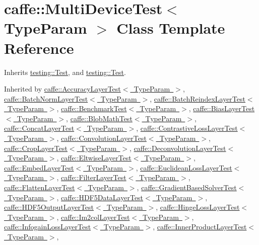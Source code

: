 \hypertarget{classcaffe_1_1_multi_device_test}{}\section{caffe\+:\+:Multi\+Device\+Test$<$ Type\+Param $>$ Class Template Reference}
\label{classcaffe_1_1_multi_device_test}


Inherits \mbox{\hyperlink{classtesting_1_1_test}{testing\+::\+Test}}, and \mbox{\hyperlink{classtesting_1_1_test}{testing\+::\+Test}}.



Inherited by \mbox{\hyperlink{classcaffe_1_1_accuracy_layer_test}{caffe\+::\+Accuracy\+Layer\+Test$<$ Type\+Param $>$}}, \mbox{\hyperlink{classcaffe_1_1_batch_norm_layer_test}{caffe\+::\+Batch\+Norm\+Layer\+Test$<$ Type\+Param $>$}}, \mbox{\hyperlink{classcaffe_1_1_batch_reindex_layer_test}{caffe\+::\+Batch\+Reindex\+Layer\+Test$<$ Type\+Param $>$}}, \mbox{\hyperlink{classcaffe_1_1_benchmark_test}{caffe\+::\+Benchmark\+Test$<$ Type\+Param $>$}}, \mbox{\hyperlink{classcaffe_1_1_bias_layer_test}{caffe\+::\+Bias\+Layer\+Test$<$ Type\+Param $>$}}, \mbox{\hyperlink{classcaffe_1_1_blob_math_test}{caffe\+::\+Blob\+Math\+Test$<$ Type\+Param $>$}}, \mbox{\hyperlink{classcaffe_1_1_concat_layer_test}{caffe\+::\+Concat\+Layer\+Test$<$ Type\+Param $>$}}, \mbox{\hyperlink{classcaffe_1_1_contrastive_loss_layer_test}{caffe\+::\+Contrastive\+Loss\+Layer\+Test$<$ Type\+Param $>$}}, \mbox{\hyperlink{classcaffe_1_1_convolution_layer_test}{caffe\+::\+Convolution\+Layer\+Test$<$ Type\+Param $>$}}, \mbox{\hyperlink{classcaffe_1_1_crop_layer_test}{caffe\+::\+Crop\+Layer\+Test$<$ Type\+Param $>$}}, \mbox{\hyperlink{classcaffe_1_1_deconvolution_layer_test}{caffe\+::\+Deconvolution\+Layer\+Test$<$ Type\+Param $>$}}, \mbox{\hyperlink{classcaffe_1_1_eltwise_layer_test}{caffe\+::\+Eltwise\+Layer\+Test$<$ Type\+Param $>$}}, \mbox{\hyperlink{classcaffe_1_1_embed_layer_test}{caffe\+::\+Embed\+Layer\+Test$<$ Type\+Param $>$}}, \mbox{\hyperlink{classcaffe_1_1_euclidean_loss_layer_test}{caffe\+::\+Euclidean\+Loss\+Layer\+Test$<$ Type\+Param $>$}}, \mbox{\hyperlink{classcaffe_1_1_filter_layer_test}{caffe\+::\+Filter\+Layer\+Test$<$ Type\+Param $>$}}, \mbox{\hyperlink{classcaffe_1_1_flatten_layer_test}{caffe\+::\+Flatten\+Layer\+Test$<$ Type\+Param $>$}}, \mbox{\hyperlink{classcaffe_1_1_gradient_based_solver_test}{caffe\+::\+Gradient\+Based\+Solver\+Test$<$ Type\+Param $>$}}, \mbox{\hyperlink{classcaffe_1_1_h_d_f5_data_layer_test}{caffe\+::\+H\+D\+F5\+Data\+Layer\+Test$<$ Type\+Param $>$}}, \mbox{\hyperlink{classcaffe_1_1_h_d_f5_output_layer_test}{caffe\+::\+H\+D\+F5\+Output\+Layer\+Test$<$ Type\+Param $>$}}, \mbox{\hyperlink{classcaffe_1_1_hinge_loss_layer_test}{caffe\+::\+Hinge\+Loss\+Layer\+Test$<$ Type\+Param $>$}}, \mbox{\hyperlink{classcaffe_1_1_im2col_layer_test}{caffe\+::\+Im2col\+Layer\+Test$<$ Type\+Param $>$}}, \mbox{\hyperlink{classcaffe_1_1_infogain_loss_layer_test}{caffe\+::\+Infogain\+Loss\+Layer\+Test$<$ Type\+Param $>$}}, \mbox{\hyperlink{classcaffe_1_1_inner_product_layer_test}{caffe\+::\+Inner\+Product\+Layer\+Test$<$ Type\+Param $>$}}, 